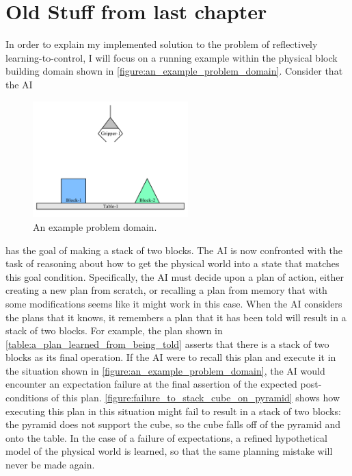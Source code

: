 \section{Old Stuff from last chapter}

In order to explain my implemented solution to the problem of
reflectively learning-to-control, I will focus on a running example
within the physical block building domain shown in
\autoref{figure:an_example_problem_domain}.  Consider that the AI 
\begin{figure}
  \includegraphics[width=6cm]{gfx/blocks_world_example-1}
  \caption[An example problem domain.]{An example problem domain.}
  \label{figure:an_example_problem_domain}
\end{figure}
has the goal of making a stack of two blocks.  The AI is now
confronted with the task of reasoning about how to get the physical
world into a state that matches this goal condition.  Specifically,
the AI must decide upon a plan of action, either creating a new plan
from scratch, or recalling a plan from memory that with some
modifications seems like it might work in this case.  When the AI
considers the plans that it knows, it remembers a plan that it has
been told will result in a stack of two blocks.  For example, the plan
shown in {\mbox{\autoref{table:a_plan_learned_from_being_told}}}
asserts that there is a stack of two blocks as its final operation.
If the AI were to recall this plan and execute it in the situation
shown in \autoref{figure:an_example_problem_domain}, the AI would
encounter an expectation failure at the final assertion of the
expected post-conditions of this plan.
{\mbox{\autoref{figure:failure_to_stack_cube_on_pyramid}}} shows how
executing this plan in this situation might fail to result in a stack
of two blocks: the pyramid does not support the cube, so the cube
falls off of the pyramid and onto the table.  In the case of a failure
of expectations, a refined hypothetical model of the physical world is
learned, so that the same planning mistake will never be made again.
